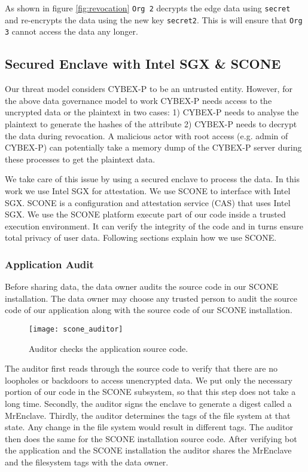 As shown in figure \ref{fig:revocation} \texttt{Org 2} decrypts the edge data using \texttt{secret} and re-encrypts the data using the new key \texttt{secret2}. This is will ensure that \texttt{Org 3} cannot access the data any longer.

\subsection{Secured Enclave with Intel SGX \& SCONE}

Our threat model considers CYBEX-P to be an untrusted entity. However, for the above data governance model to work CYBEX-P needs access to the uncrypted data or the plaintext in two cases: 1) CYBEX-P needs to analyse the plaintext to generate the hashes of the attribute 2) CYBEX-P needs to decrypt the data during revocation. A malicious actor with root access (e.g. admin of CYBEX-P) can potentially take a memory dump of the CYBEX-P server during these processes to get the plaintext data.

We take care of this issue by using a secured enclave to process the data. In this work we use Intel SGX \cite{costan2016intel} for attestation. We use SCONE \cite{199364} to interface with Intel SGX. SCONE is a configuration and attestation service (CAS) that uses Intel SGX. We use the SCONE platform execute part of our code inside a trusted execution environment. It can verify the integrity of the code and in turns ensure total privacy of user data. Following sections explain how we use SCONE.

\subsubsection{Application Audit}

Before sharing data, the data owner audits the source code in our SCONE installation. The data owner may choose any trusted person to audit the source code of our application along with the source code of our SCONE installation.

\begin{figure}[ht]
	\texttt{[image: scone\_auditor]}
	\centering
	\caption{Auditor checks the application source code.}
	\label{fig:audit}
\end{figure}

The auditor first reads through the source code to verify that there are no loopholes or backdoors to access unencrypted data. We put only the necessary portion of our code in the SCONE subsystem, so that this step does not take a long time. Secondly, the auditor signs the enclave to generate a digest called a MrEnclave. Thirdly, the auditor determines the tags of the file system at that state. Any change in the file system would result in different tags. The auditor then does the same for the SCONE installation source code. After verifying bot the application and the SCONE installation the auditor shares the MrEnclave and the filesystem tags with the data owner.

